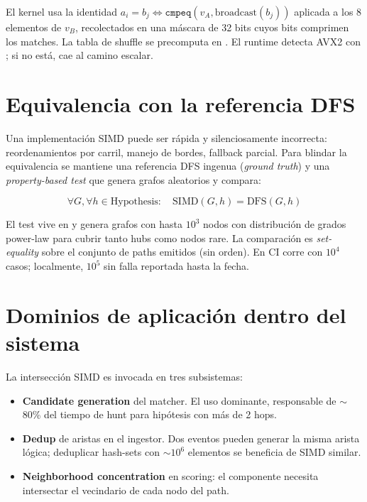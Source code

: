 El kernel usa la identidad
$a_i = b_j \iff \texttt{cmpeq}(v_A, \text{broadcast}(b_j))$ aplicada
a los 8 elementos de $v_B$, recolectados en una máscara de 32 bits
cuyos bits comprimen los matches. La tabla de shuffle se precomputa
en . El runtime detecta AVX2 con
; si no está, cae al camino
escalar.

\section{Equivalencia con la referencia DFS}

Una implementación SIMD puede ser rápida y silenciosamente
incorrecta: reordenamientos por carril, manejo de bordes, fallback
parcial. Para blindar la equivalencia se mantiene una referencia
DFS ingenua (\emph{ground truth}) y una \emph{property-based test}
que genera grafos aleatorios y compara:

\begin{equation}
\forall G, \forall h \in \text{Hypothesis}:
\quad \text{SIMD}(G, h) = \text{DFS}(G, h)
\label{eq:paper-equiv}
\end{equation}

El test vive en
 y genera
grafos con hasta $10^3$ nodos con distribución de grados
power-law para cubrir tanto hubs como nodos rare. La
comparación es \emph{set-equality} sobre el conjunto de paths
emitidos (sin orden). En CI corre con $10^4$ casos; localmente,
$10^5$ sin falla reportada hasta la fecha.

\section{Dominios de aplicación dentro del sistema}

La intersección SIMD es invocada en tres subsistemas:

\begin{itemize}
    \item \textbf{Candidate generation} del matcher. El uso
    dominante, responsable de $\sim$80\% del tiempo de hunt para
    hipótesis con más de 2 hops.
    \item \textbf{Dedup} de aristas en el ingestor. Dos eventos
    pueden generar la misma arista lógica; deduplicar hash-sets
    con $\sim 10^6$ elementos se beneficia de SIMD similar.
    \item \textbf{Neighborhood concentration} en scoring: el
    componente necesita intersectar el vecindario de cada nodo
    del path.
\end{itemize}

